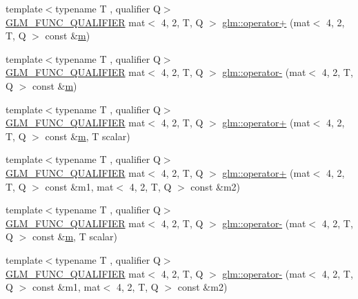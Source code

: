\begin{DoxyCompactItemize}
\item 
{\footnotesize template$<$typename T , qualifier Q$>$ }\\\hyperlink{setup_8hpp_a33fdea6f91c5f834105f7415e2a64407}{G\+L\+M\+\_\+\+F\+U\+N\+C\+\_\+\+Q\+U\+A\+L\+I\+F\+I\+ER} mat$<$ 4, 2, T, Q $>$ \hyperlink{namespaceglm_a5a24a65cc59a2bd4c7770a67105bc7f2}{glm\+::operator+} (mat$<$ 4, 2, T, Q $>$ const \&\hyperlink{_s_d_l__opengl__glext_8h_af593500c283bf1a787a6f947f503a5c2}{m})
\item 
{\footnotesize template$<$typename T , qualifier Q$>$ }\\\hyperlink{setup_8hpp_a33fdea6f91c5f834105f7415e2a64407}{G\+L\+M\+\_\+\+F\+U\+N\+C\+\_\+\+Q\+U\+A\+L\+I\+F\+I\+ER} mat$<$ 4, 2, T, Q $>$ \hyperlink{namespaceglm_ad9796904f16f8a07d97f8a3baefe44e4}{glm\+::operator-\/} (mat$<$ 4, 2, T, Q $>$ const \&\hyperlink{_s_d_l__opengl__glext_8h_af593500c283bf1a787a6f947f503a5c2}{m})
\item 
{\footnotesize template$<$typename T , qualifier Q$>$ }\\\hyperlink{setup_8hpp_a33fdea6f91c5f834105f7415e2a64407}{G\+L\+M\+\_\+\+F\+U\+N\+C\+\_\+\+Q\+U\+A\+L\+I\+F\+I\+ER} mat$<$ 4, 2, T, Q $>$ \hyperlink{namespaceglm_aff91c1ef1cd3e33281be9320e6638697}{glm\+::operator+} (mat$<$ 4, 2, T, Q $>$ const \&\hyperlink{_s_d_l__opengl__glext_8h_af593500c283bf1a787a6f947f503a5c2}{m}, T scalar)
\item 
{\footnotesize template$<$typename T , qualifier Q$>$ }\\\hyperlink{setup_8hpp_a33fdea6f91c5f834105f7415e2a64407}{G\+L\+M\+\_\+\+F\+U\+N\+C\+\_\+\+Q\+U\+A\+L\+I\+F\+I\+ER} mat$<$ 4, 2, T, Q $>$ \hyperlink{namespaceglm_acd77373f051287456ca382530b3371fc}{glm\+::operator+} (mat$<$ 4, 2, T, Q $>$ const \&m1, mat$<$ 4, 2, T, Q $>$ const \&m2)
\item 
{\footnotesize template$<$typename T , qualifier Q$>$ }\\\hyperlink{setup_8hpp_a33fdea6f91c5f834105f7415e2a64407}{G\+L\+M\+\_\+\+F\+U\+N\+C\+\_\+\+Q\+U\+A\+L\+I\+F\+I\+ER} mat$<$ 4, 2, T, Q $>$ \hyperlink{namespaceglm_ad3a99eb808e893cf4f661d4f95c3e366}{glm\+::operator-\/} (mat$<$ 4, 2, T, Q $>$ const \&\hyperlink{_s_d_l__opengl__glext_8h_af593500c283bf1a787a6f947f503a5c2}{m}, T scalar)
\item 
{\footnotesize template$<$typename T , qualifier Q$>$ }\\\hyperlink{setup_8hpp_a33fdea6f91c5f834105f7415e2a64407}{G\+L\+M\+\_\+\+F\+U\+N\+C\+\_\+\+Q\+U\+A\+L\+I\+F\+I\+ER} mat$<$ 4, 2, T, Q $>$ \hyperlink{namespaceglm_a4d6111edc1baea704f9fcf712e4f0fc2}{glm\+::operator-\/} (mat$<$ 4, 2, T, Q $>$ const \&m1, mat$<$ 4, 2, T, Q $>$ const \&m2)

\end{DoxyCompactItemize}
